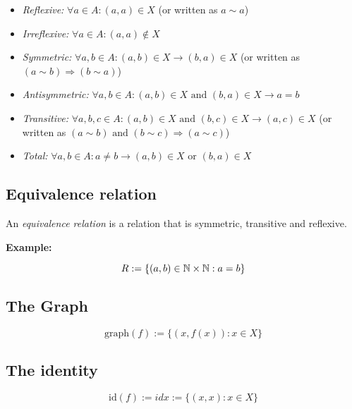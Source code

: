 \begin{itemize}

	\item \emph{Reflexive:} \(\forall a \in A: (a, a) \in X\) (or written as \(a \sim a\))

	\item \emph{Irreflexive:} \(\forall a \in A: (a, a) \not\in X\)

	\item \emph{Symmetric:} \(\forall a, b \in A: (a, b) \in X \to (b, a) \in X\) (or written as 
		  \((a \sim b) \Rightarrow (b \sim a)\))

	\item \emph{Antisymmetric:} \(\forall a, b \in A: (a, b) \in X \text{ and } (b, a) \in X \to a = b\)

	\item \emph{Transitive:} \(\forall a, b, c \in A: (a, b) \in X \text{ and } (b, c) \in X \to (a, c) 
		  \in X\) (or written as \((a \sim b) \text{ and } (b \sim c) \Rightarrow (a \sim c)\))

	\item \emph{Total:} \(\forall a,b \in A: a \neq b \to (a, b) \in X \text{ or } (b, a) \in X\)

\end{itemize}

\subsection{Equivalence relation}

An \emph{equivalence relation} is a relation that is symmetric, transitive and reflexive.
\vspace{\baselineskip}

\textbf{Example:}
\vspace{\baselineskip}

\[
	R:= \{ (a,b) \in \mathbb{N} \times \mathbb{N}: a = b\}
\]

\subsection{The Graph}

\[
	\text{graph}(f):= \{(x, f(x)): x \in X\}
\]

\subsection{The identity}

\[
	\text{id}(f):= idx:= \{(x, x): x \in X\}
\]

